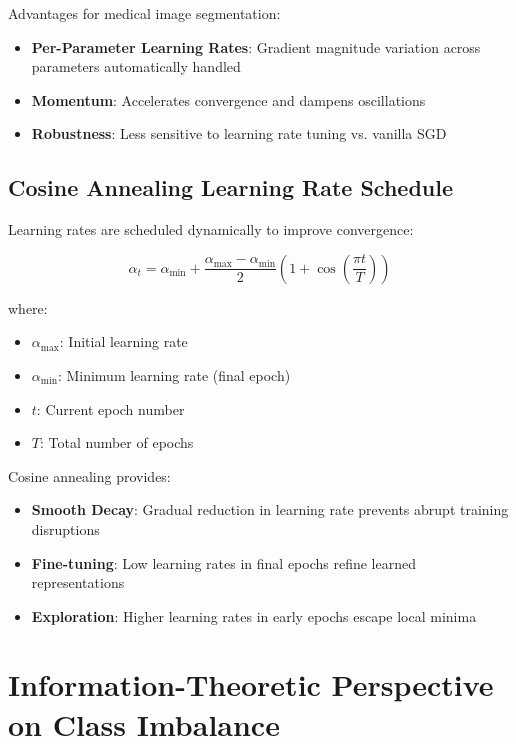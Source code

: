\documentclass{ecsproject}     %
\begin{document}
Advantages for medical image segmentation:
\begin{itemize}
    \item \textbf{Per-Parameter Learning Rates}: Gradient magnitude variation across parameters automatically handled
    \item \textbf{Momentum}: Accelerates convergence and dampens oscillations
    \item \textbf{Robustness}: Less sensitive to learning rate tuning vs. vanilla SGD
\end{itemize}

\subsection{Cosine Annealing Learning Rate Schedule}

Learning rates are scheduled dynamically to improve convergence:

\begin{equation}
\alpha_t = \alpha_{\min} + \frac{\alpha_{\max} - \alpha_{\min}}{2}\left(1 + \cos\left(\frac{\pi t}{T}\right)\right)
\label{Eq:CosineAnnealing}
\end{equation}

where:
\begin{itemize}
    \item $\alpha_{\max}$: Initial learning rate
    \item $\alpha_{\min}$: Minimum learning rate (final epoch)
    \item $t$: Current epoch number
    \item $T$: Total number of epochs
\end{itemize}

Cosine annealing provides:
\begin{itemize}
    \item \textbf{Smooth Decay}: Gradual reduction in learning rate prevents abrupt training disruptions
    \item \textbf{Fine-tuning}: Low learning rates in final epochs refine learned representations
    \item \textbf{Exploration}: Higher learning rates in early epochs escape local minima
\end{itemize}

\section{Information-Theoretic Perspective on Class Imbalance}
\end{document}

